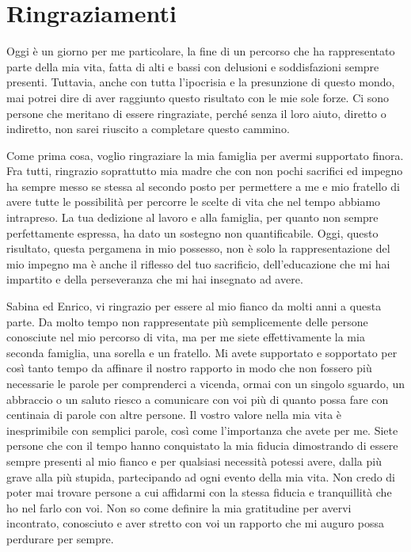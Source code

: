 \chapter*{Ringraziamenti}
\fancyhf{}

Oggi è un giorno per me particolare, la fine di un percorso che ha rappresentato parte della mia vita, fatta di alti e bassi con delusioni e soddisfazioni sempre presenti. Tuttavia, anche con tutta l'ipocrisia e la presunzione di questo mondo, mai potrei dire di aver raggiunto questo risultato con le mie sole forze. Ci sono persone che meritano di essere ringraziate, perché senza il loro aiuto, diretto o indiretto, non sarei riuscito a completare questo cammino.

Come prima cosa, voglio ringraziare la mia famiglia per avermi supportato finora. Fra tutti, ringrazio soprattutto mia madre che con non pochi sacrifici ed impegno ha sempre messo se stessa al secondo posto per permettere a me e mio fratello di avere tutte le possibilità per percorre le scelte di vita che nel tempo abbiamo intrapreso. La tua dedizione al lavoro e alla famiglia, per quanto non sempre perfettamente espressa, ha dato un sostegno non quantificabile. Oggi, questo risultato, questa pergamena in mio possesso, non è solo la rappresentazione del mio impegno ma è anche il riflesso del tuo sacrificio, dell'educazione che mi hai impartito e della perseveranza che mi hai insegnato ad avere.

Sabina ed Enrico, vi ringrazio per essere al mio fianco da molti anni a questa parte. Da molto tempo non rappresentate più semplicemente delle persone conosciute nel mio percorso di vita, ma per me siete effettivamente la mia seconda famiglia, una sorella e un fratello. Mi avete supportato e sopportato per così tanto tempo da affinare il nostro rapporto in modo che non fossero più necessarie le parole per comprenderci a vicenda, ormai con un singolo sguardo, un abbraccio o un saluto riesco a comunicare con voi più di quanto possa fare con centinaia di parole con altre persone. Il vostro valore nella mia vita è inesprimibile con semplici parole, così come l'importanza che avete per me. Siete persone che con il tempo hanno conquistato la mia fiducia dimostrando di essere sempre presenti al mio fianco e per qualsiasi necessità potessi avere, dalla più grave alla più stupida, partecipando ad ogni evento della mia vita. Non credo di poter mai trovare persone a cui affidarmi con la stessa fiducia e tranquillità che ho nel farlo con voi. Non so come definire la mia gratitudine per avervi incontrato, conosciuto e aver stretto con voi un rapporto che mi auguro possa perdurare per sempre.

